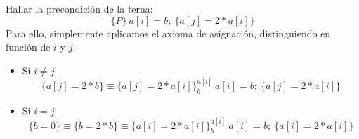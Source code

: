 \begin{ejercicio}
    Hallar la precondición de la terna:
    \begin{equation*}
        \{P\}\ a[i]=b;\ \{a[j] = 2\ast a[i]\}
    \end{equation*}
    Para ello, simplemente aplicamos el axioma de asignación, distinguiendo en función de $i$ y $j$:
    \begin{itemize}
        \item Si $i\neq j$:
        \begin{equation*}
            \{a[j]=2\ast b\} \equiv \{a[j]=2\ast a[i]\}_{b}^{a[i]}\ a[i]=b;\ \{a[j] = 2\ast a[i]\}
        \end{equation*}
        \item Si $i= j$:
        \begin{equation*}
            \{b=0\}\equiv \{b=2\ast b\} \equiv \{a[i]=2\ast a[i]\}_{b}^{a[i]}\ a[i]=b;\ \{a[i] = 2\ast a[i]\}
        \end{equation*}
    \end{itemize}
\end{ejercicio}


